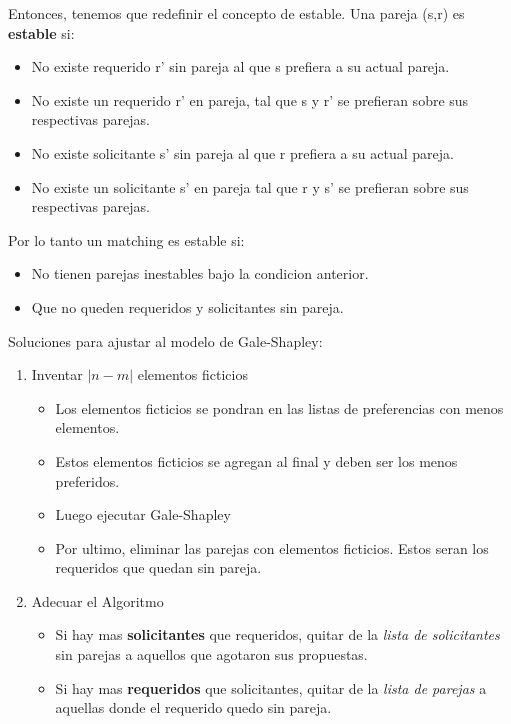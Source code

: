 \documentclass{article}
\begin{document}
Entonces, tenemos que redefinir el concepto de estable. Una pareja (s,r) es \textbf{estable} si:
\begin{itemize}
    \item No existe requerido r' sin pareja al que s prefiera a su actual pareja.
    \item No existe un requerido r' en pareja, tal que s y r' se prefieran sobre sus respectivas parejas.
    \item No existe solicitante s' sin pareja al que r prefiera a su actual pareja.
    \item No existe un solicitante s' en pareja tal que r y s' se prefieran sobre sus respectivas parejas.
\end{itemize}    


Por lo tanto un matching es estable si:
\begin{itemize}
    \item No tienen parejas inestables bajo la condicion anterior.
    \item Que no queden requeridos y solicitantes sin pareja.
\end{itemize}

Soluciones para ajustar al modelo de Gale-Shapley:
\begin{enumerate}
    \item Inventar \(|n-m|\) elementos ficticios
    \begin{itemize}
        \item Los elementos ficticios se pondran en las listas de preferencias con menos elementos.
        \item Estos elementos ficticios se agregan al final y deben ser los menos preferidos.
        \item Luego ejecutar Gale-Shapley
        \item Por ultimo, eliminar las parejas con elementos ficticios. Estos seran los requeridos que quedan sin pareja.
    \end{itemize}
    \item Adecuar el Algoritmo
    \begin{itemize}
        \item Si hay mas \textbf{solicitantes} que requeridos, quitar de la \textit{lista de solicitantes} sin parejas a aquellos que agotaron sus propuestas.
        \item Si hay mas \textbf{requeridos} que solicitantes, quitar de la \textit{lista de parejas} a aquellas donde el requerido quedo sin pareja.
    \end{itemize}
\end{enumerate}
\end{document}
